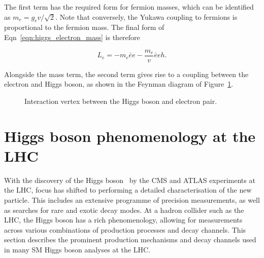 \noindent The first term has the required form for fermion masses, which can be identified as $m_{e}=g_{e}v/\sqrt{2}$. Note that conversely, the Yukawa coupling to fermions is proportional to the fermion mass. The final form of Eqn~\ref{eqn:higgs_electron_mass} is therefore

\begin{equation}
    L_{e} = -m_{e}\bar{e}e - \frac{m_{e}}{v}\bar{e}eh.
\end{equation}

\noindent Alongside the mass term, the second term gives rise to a coupling between the electron and Higgs boson, as shown in the Feynman diagram of Figure~\ref{fig:h_ee_vertex}.

\begin{figure}[htb]
  \centering
  \caption[The interaction between the Higgs boson and electron pair.]{Interaction vertex between the Higgs boson and electron pair.}
  \label{fig:h_ee_vertex}
\end{figure}


\section{Higgs boson phenomenology at the LHC}

With the discovery of the Higgs boson~\cite{Aad:2012tfa,Chatrchyan:2012xdj,Chatrchyan:2013lba}  by the CMS and ATLAS experiments at the LHC, focus has shifted to performing a detailed characterisation of the new particle. This includes an extensive programme of precision measurements, as well as searches for rare and exotic decay modes. At a hadron collider such as the LHC, the Higgs boson has a rich phenomenology, allowing for measurements across various combinations of production processes and decay channels. This section describes the prominent production mechanisms and decay channels used in many SM Higgs boson analyses at the LHC.

